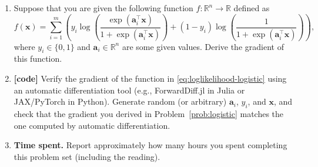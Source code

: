 \documentclass[letterpaper]{article}
\newcommand{\Real}{\mathbb{R}}
\newcommand{\tr}{^\top}
\begin{document}
\begin{enumerate}
\item \label{prob:logistic} Suppose that you are given the following function $f\colon \Real^n \to \Real$ defined as
  \begin{equation} \label{eq:loglikelihood-logistic}
    f(\bm{x}) = \sum_{i=1}^m \left( y_i \log  \left( \frac{\exp(\bm{a}_i\tr \bm{x})}{1+\exp(\bm{a}_i\tr  \bm{x})} \right) +  (1-y_i) \log  \left( \frac{1}{1+\exp(\bm{a}_i\tr  \bm{x})} \right) \right) ,
\end{equation}
  where $y_i\in \{0,1\}$ and $\bm{a}_i\in \Real^n$ are some given values. Derive the gradient of this function.
  
\item \textbf{[code]} Verify the gradient of the function in \eqref{eq:loglikelihood-logistic} using an automatic differentiation tool (e.g., ForwardDiff.jl in Julia or JAX/PyTorch in Python). Generate random (or arbitrary) $\bm{a}_i$, $y_i$, and $\bm{x}$, and check that the gradient you derived in Problem~\ref{prob:logistic} matches the one computed by automatic differentiation.
  
\item \textbf{Time spent.} Report approximately how many hours you spent completing this problem set (including the reading).
\end{enumerate}
\end{document}
